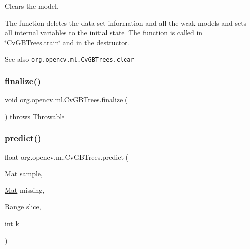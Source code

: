 Clears the model.

The function deletes the data set information and all the weak models and sets all internal variables to the initial state. The function is called in \char`\"{}\+Cv\+G\+B\+Trees.\+train\char`\"{} and in the destructor.

\begin{DoxySeeAlso}{See also}
\href{http://docs.opencv.org/modules/ml/doc/gradient_boosted_trees.html#cvgbtrees-clear}{\tt org.\+opencv.\+ml.\+Cv\+G\+B\+Trees.\+clear} 
\end{DoxySeeAlso}
\mbox{\label{classorg_1_1opencv_1_1ml_1_1_cv_g_b_trees_a50a588f4d215381826abc7c622f22969}} 
\subsubsection{\texorpdfstring{finalize()}{finalize()}}
{\footnotesize\ttfamily void org.\+opencv.\+ml.\+Cv\+G\+B\+Trees.\+finalize (\begin{DoxyParamCaption}{ }\end{DoxyParamCaption}) throws Throwable\hspace{0.3cm}{\ttfamily [protected]}}

\mbox{\label{classorg_1_1opencv_1_1ml_1_1_cv_g_b_trees_a3311e584ea329ff9193da76e124919c5}} 
\subsubsection{\texorpdfstring{predict()}{predict()}\hspace{0.1cm}{\footnotesize\ttfamily [1/2]}}
{\footnotesize\ttfamily float org.\+opencv.\+ml.\+Cv\+G\+B\+Trees.\+predict (\begin{DoxyParamCaption}\item[{\mbox{\hyperlink{classorg_1_1opencv_1_1core_1_1_mat}{Mat}}}]{sample,  }\item[{\mbox{\hyperlink{classorg_1_1opencv_1_1core_1_1_mat}{Mat}}}]{missing,  }\item[{\mbox{\hyperlink{classorg_1_1opencv_1_1core_1_1_range}{Range}}}]{slice,  }\item[{int}]{k }\end{DoxyParamCaption})}

